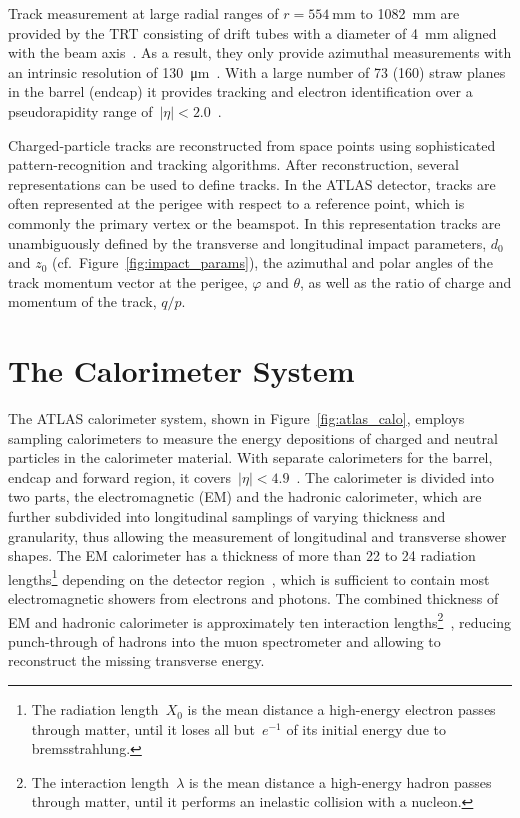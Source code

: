 Track measurement at large radial ranges of $r = \SI{554}{\milli\metre}$ to
\SI{1082}{\milli\metre} are provided by the TRT consisting of drift tubes with a
diameter of \SI{4}{\milli\metre} aligned with the beam
axis~\cite{atlas_detector}. As a result, they only provide azimuthal
measurements with an intrinsic resolution of
\SI{130}{\micro\metre}~\cite{atlas_detector}. With a large number of 73 (160)
straw planes in the barrel (endcap) it provides tracking and electron
identification over a pseudorapidity range
of~$|\eta| < 2.0$~\cite{atlas_detector}.

Charged-particle tracks are reconstructed from space points using sophisticated
pattern-recognition and tracking algorithms. After reconstruction, several
representations can be used to define tracks. In the ATLAS detector, tracks are
often represented at the perigee with respect to a reference point, which is
commonly the primary vertex or the beamspot. In this representation tracks are
unambiguously defined by the transverse and longitudinal impact parameters,
$d_0$ and $z_0$ (cf.\ Figure~\ref{fig:impact_params}), the azimuthal and polar
angles of the track momentum vector at the perigee, $\varphi$ and $\theta$, as
well as the ratio of charge and momentum of the track, $q / p$.


\section{The Calorimeter System}
\label{sec:atlas_calo}

The ATLAS calorimeter system, shown in Figure~\ref{fig:atlas_calo}, employs
sampling calorimeters to measure the energy depositions of charged and neutral
particles in the calorimeter material. With separate calorimeters for the
barrel, endcap and forward region, it
covers~\mbox{$|\eta| < 4.9$}~\cite{atlas_detector}. The calorimeter is divided
into two parts, the electromagnetic (EM) and the hadronic calorimeter, which are
further subdivided into longitudinal samplings of varying thickness and
granularity, thus allowing the measurement of longitudinal and transverse shower
shapes. The EM calorimeter has a thickness of more than 22 to 24 radiation
lengths\footnote{The radiation length~$X_0$ is the mean distance a high-energy
  electron passes through matter, until it loses all but~$e^{-1}$ of its initial
  energy due to bremsstrahlung.} depending on the detector
region~\cite{atlas_detector}, which is sufficient to contain most
electromagnetic showers from electrons and photons. The combined thickness of EM
and hadronic calorimeter is approximately ten interaction lengths\footnote{The
  interaction length~$\lambda$ is the mean distance a high-energy hadron passes
  through matter, until it performs an inelastic collision with a
  nucleon.}~\cite{atlas_detector}, reducing punch-through of hadrons into the
muon spectrometer and allowing to reconstruct the missing transverse energy.

